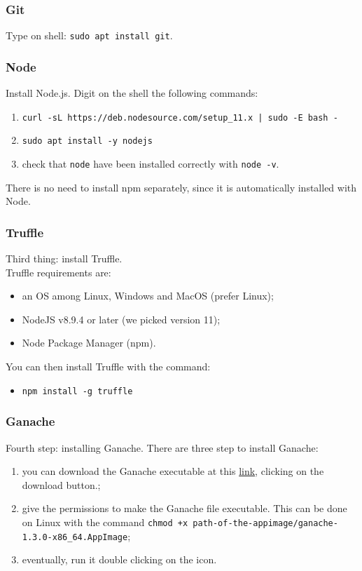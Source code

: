 \subsubsection{Git}
Type on shell: \texttt{sudo apt install git}.

\subsubsection{Node}
Install Node.js. Digit on the shell the following commands:
\begin{enumerate}
	\item \texttt{curl -sL https://deb.nodesource.com/setup\_11.x | sudo -E bash -}
	\item \texttt{sudo apt install -y nodejs}
	\item check that \texttt{node} have been installed correctly with \texttt{node -v}.
\end{enumerate}
There is no need to install npm separately, since it is automatically installed with Node.

\subsubsection{Truffle}
Third thing: install Truffle.\\
Truffle requirements are:
\begin{itemize}
	\item an OS among Linux, Windows and MacOS (prefer Linux);
	\item NodeJS v8.9.4 or later (we picked version 11);
	\item Node Package Manager (npm).
\end{itemize}
You can then install Truffle with the command:
\begin{itemize}
	\item[] \texttt{npm install -g truffle}
\end{itemize}

\subsubsection{Ganache}
Fourth step: installing Ganache. There are three step to install Ganache:
\begin{enumerate}
	\item you can download the Ganache executable at this \href{https://truffleframework.com/ganache}{link}, clicking on the download button.;
	\item give the permissions to make the Ganache file executable. This can be done on Linux with the command \texttt{chmod +x path-of-the-appimage/ganache-1.3.0-x86\_64.AppImage};
	\item eventually, run it double clicking on the icon.
\end{enumerate}

